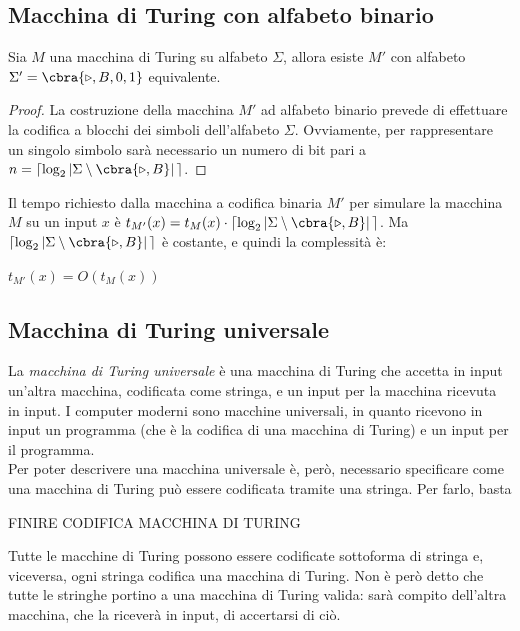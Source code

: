 \subsection{Macchina di Turing con alfabeto binario}
\begin{thm}
    Sia $M$ una macchina di Turing su alfabeto $\Sigma$, allora esiste $M'$
    con alfabeto $\Sigma' = \cbra{\triangleright, B, 0, 1}$ equivalente.
\end{thm}
\begin{proof}
    La costruzione della macchina $M'$ ad alfabeto binario prevede di
    effettuare la codifica a blocchi dei simboli dell'alfabeto $\Sigma$.
    Ovviamente, per rappresentare un singolo simbolo sarà necessario un
    numero di bit pari a
    $n = \lceil \log_2 |\Sigma \setminus \cbra{ \triangleright, B}| \, \rceil$.
\end{proof}
\begin{rem}
    Il tempo richiesto dalla macchina a codifica binaria $M'$ per simulare
    la macchina $M$ su un input $x$ è
    $t_{M'}(x) = t_M(x) \cdot \lceil \log_2
    |\Sigma \setminus \cbra{\triangleright, B}| \, \rceil$.
    Ma $\lceil \log_2 |\Sigma \setminus \cbra{\triangleright, B}| \, \rceil$
    è costante, e quindi la complessità è:
    \begin{center}
        $t_{M'}(x) = O(t_M(x))$
    \end{center}
\end{rem}

\subsection{Macchina di Turing universale}
La \textit{macchina di Turing universale} è una macchina di Turing che accetta
in input un'altra macchina, codificata come stringa, e un input per la macchina
ricevuta in input.
I computer moderni sono macchine universali, in quanto ricevono in input un
programma (che è la codifica di una macchina di Turing) e un
input per il programma.\\
Per poter descrivere una macchina universale è, però, necessario specificare
come una macchina di Turing può essere codificata tramite una stringa.
Per farlo, basta

FINIRE CODIFICA MACCHINA DI TURING

Tutte le macchine di Turing possono essere codificate sottoforma di stringa e,
viceversa, ogni stringa codifica una macchina di Turing.
Non è però detto che tutte le stringhe portino a una macchina di Turing valida:
sarà compito dell'altra macchina, che la riceverà in input, di
accertarsi di ciò.

